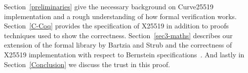 Section~\ref{preliminaries} give the necessary background on Curve25519
implementation and a rough understanding of how formal verification works.
Section~\ref{C-Coq} provides the specification of X25519 in addition to proofs
techniques used to show the correctness.
Section~\ref{sec3-maths} describes our extension of the formal library by Bartzia
and Strub and the correctness of X25519 implementation with respect to Bernstein
specifications~\cite{Ber14}.
And lastly in Section~\ref{Conclusion} we discuss the trust in this proof.



%
%
